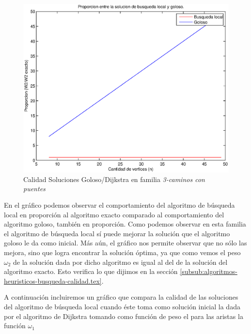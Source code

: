 \begin{figure}[H]
  \begin{center}
    \begin{minipage}{0.5\linewidth}
      \includegraphics[width=\linewidth]{graficos/busq_local_proporcion2.eps}
      \caption{Calidad Soluciones Goloso/Dijkstra en familia \emph{3-caminos con puentes}}\label{fig:busq-local-proporcion-2}
    \end{minipage}
  \end{center}
\end{figure}

En el gráfico podemos observar el comportamiento del algoritmo de búsqueda local en proporción al algoritmo exacto comparado al comportamiento del algoritmo goloso, también en proporción. Como podemos observar en esta familia el algoritmo de búsqueda local sí puede mejorar la solución que el algoritmo goloso le da como inicial. Más aún, el gráfico nos permite observar que no sólo las mejora, sino que logra encontrar la solución óptima, ya que como vemos el peso $\omega_2$ de la solución dada por dicho algoritmo es igual al del de la solución del algoritmo exacto. Esto verifica lo que dijimos en la sección \ref{subsub:algoritmos-heuristicos-busqueda-calidad.tex}.

A continuación incluiremos un gráfico que compara la calidad de las soluciones del algoritmo de búsqueda local cuando éste toma como solución inicial la dada por el algoritmo de Dijkstra tomando como función de peso el para las aristas la función $\omega_1$



